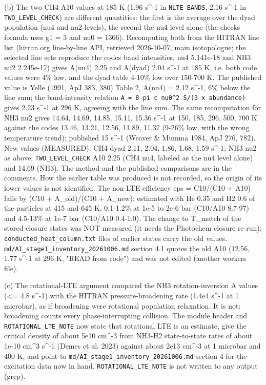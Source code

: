 \documentclass[english,a4paper]{my_memo}
\begin{document}
(b) The two CH4 A10 values at 185 K (1.96 s\^{}-1 in \texttt{NLTE\_BANDS}, 2.16 s\^{}-1 in
\texttt{TWO\_LEVEL\_CHECK}) are different quantities: the first is the average over
the dyad population (nu4 and nu2 levels), the second the nu4 level alone
(the check\textquotesingle s formula uses g1 = 3 and nu0 = 1306). Recomputing both from the
HITRAN line list (hitran.org line-by-line API, retrieved 2026-10-07, main
isotopologue; the selected line sets reproduce the code\textquotesingle s band intensities,
nu4 5.141e-18 and NH3 nu2 2.245e-17) gives A(nu4) 2.25 and A(dyad) 2.04 s\^{}-1
at 185 K, i.e. both code values were 4\% low, and the dyad table 4-10\% low
over 150-700 K. The published value is Yelle (1991, ApJ 383, 380) Table 2,
A(nu4) = 2.12 s\^{}-1, 6\% below the line sum; the band-intensity relation
\texttt{A\ =\ 8\ pi\ c\ nu0\^{}2\ S/(3\ x\ abundance)} gives 2.23 s\^{}-1 at 296 K, agreeing with
the line sum. The same recomputation for NH3 nu2 gives 14.64, 14.69, 14.85,
15.11, 15.36 s\^{}-1 at 150, 185, 296, 500, 700 K against the code\textquotesingle s 13.46,
13.21, 12.56, 11.89, 11.37 (9-26\% low, with the wrong temperature trend);
published 15 s\^{}-1 (Weaver \& Mumma 1984, ApJ 276, 782). New values (MEASURED):
CH4 dyad 2.11, 2.04, 1.86, 1.68, 1.59 s\^{}-1; NH3 nu2 as above;
\texttt{TWO\_LEVEL\_CHECK} A10 2.25 (CH4 nu4, labeled as the nu4 level alone) and
14.69 (NH3). The method and the published comparisons are in the comments.
How the earlier table was produced is not recorded, so the origin of its
lower values is not identified. The non-LTE efficiency eps = C10/(C10 + A10)
falls by (C10 + A\_old)/(C10 + A\_new): estimated with He 0.35 and H2 0.6 of
the particles at 415 and 645 K, 0.1-1.2\% at 1e-5 to 2e-6 bar (C10/A10 8.7-97)
and 4.5-13\% at 1e-7 bar (C10/A10 0.4-1.0). The change to T\_match of the stored
closure states was NOT measured (it needs the Photochem closure re-run);
\texttt{conducted\_heat\_column.txt} files of earlier states carry the old values.
\texttt{md/AI\_stage1\_inventory\_20261006.md} section 4.1 quotes the old A10 (12.56,
1.77 s\^{}-1 at 296 K, "READ from code") and was not edited (another worker\textquotesingle s
file).

(c) The rotational-LTE argument compared the NH3 rotation-inversion A values
(\textless= 4.8 s\^{}-1) with the HITRAN pressure-broadening rate (1.4e4 s\^{}-1 at 1
microbar), as if broadening were rotational population relaxation. It is
not: broadening counts every phase-interrupting collision. The module header
and \texttt{ROTATIONAL\_LTE\_NOTE} now state that rotational LTE is an estimate, give
the critical density of about 5e10 cm\^{}-3 from NH3-H2 state-to-state rates of
about 1e-10 cm\^{}3 s\^{}-1 (Demes et al. 2023) against about 2e13 cm\^{}-3 at
1 microbar and 400 K, and point to \texttt{md/AI\_stage1\_inventory\_20261006.md}
section 4 for the excitation data now in hand. \texttt{ROTATIONAL\_LTE\_NOTE} is not
written to any output (grep).
\end{document}
